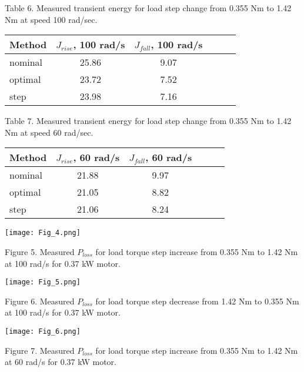 \documentclass[journal]{IEEEtran}
\begin{document}
\begin{center}
Table 6.
Measured transient energy for load step change from 0.355 Nm to 1.42 Nm at speed 100 rad/sec.

\begin{tabular}{ | l | c | c | c | c | c | }
\hline 
Method & $J_{rise}$, 100 rad/s & $J_{fall}$, 100 rad/s \\
\hline 
nominal & 25.86  & 9.07   \\
optimal & 23.72  & 7.52   \\
step & 23.98  & 7.16   \\
\hline 
\end{tabular}

\end{center}

\begin{center}
Table 7.
Measured transient energy for load step change from 0.355 Nm to 1.42 Nm at speed 60 rad/sec.

\begin{tabular}{ | l | c | c | c | c | c | }
\hline 
Method & $J_{rise}$, 60 rad/s & $J_{fall}$, 60 rad/s \\
\hline 
nominal & 21.88  & 9.97   \\
optimal & 21.05  & 8.82   \\
step & 21.06  & 8.24   \\
\hline 
\end{tabular}

\end{center}

\begin{center}
\ifpdf \texttt{[image: Fig\_4.png]}
\fi

Figure 5. Measured $P_{loss}$ for load torque step increase from 0.355 Nm to 1.42 Nm at 100 rad/s for 0.37 kW motor.
\end{center}

\begin{center}
\ifpdf \texttt{[image: Fig\_5.png]}
\fi

Figure 6. Measured $P_{loss}$ for load torque step decrease from 1.42 Nm to 0.355 Nm at 100 rad/s for 0.37 kW motor.
\end{center}

\begin{center}
\ifpdf \texttt{[image: Fig\_6.png]}
\fi

Figure 7. Measured $P_{loss}$ for load torque step increase from 0.355 Nm to 1.42 Nm at 60 rad/s for 0.37 kW motor.
\end{center}
\end{document}
